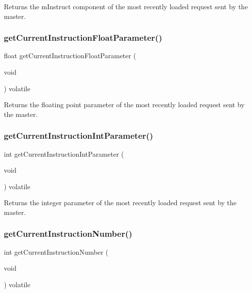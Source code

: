 Returns the m\+Instruct component of the most recently loaded request sent by the master. 

\mbox{\label{class_master_a32c23c46b93673a8817bf54cf4a52372}} 
\subsubsection{\texorpdfstring{getCurrentInstructionFloatParameter()}{getCurrentInstructionFloatParameter()}}
{\footnotesize\ttfamily float get\+Current\+Instruction\+Float\+Parameter (\begin{DoxyParamCaption}\item[{void}]{ }\end{DoxyParamCaption}) volatile}



Returns the floating point parameter of the most recently loaded request sent by the master. 

\mbox{\label{class_master_a918b5964fa7cfc2ef6cf54960a80ced5}} 
\subsubsection{\texorpdfstring{getCurrentInstructionIntParameter()}{getCurrentInstructionIntParameter()}}
{\footnotesize\ttfamily int get\+Current\+Instruction\+Int\+Parameter (\begin{DoxyParamCaption}\item[{void}]{ }\end{DoxyParamCaption}) volatile}



Returns the integer parameter of the most recently loaded request sent by the master. 

\mbox{\label{class_master_a250b4f7cdb96abb0be9ffdc54d00be31}} 
\subsubsection{\texorpdfstring{getCurrentInstructionNumber()}{getCurrentInstructionNumber()}}
{\footnotesize\ttfamily int get\+Current\+Instruction\+Number (\begin{DoxyParamCaption}\item[{void}]{ }\end{DoxyParamCaption}) volatile}



